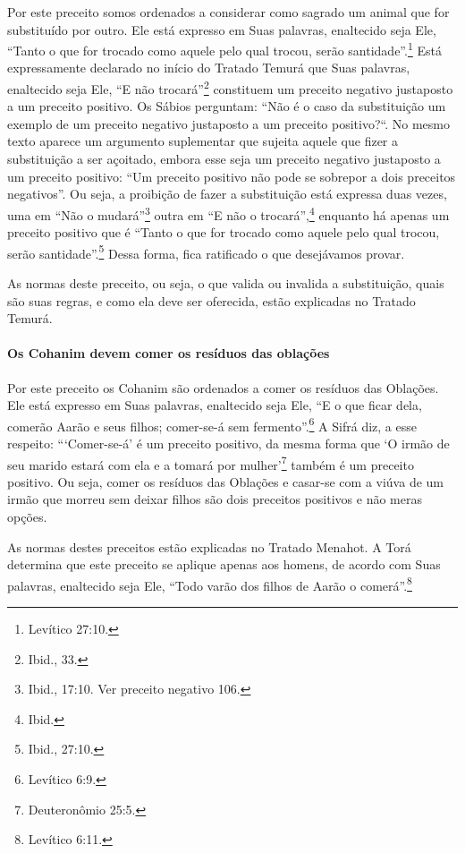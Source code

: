 Por este preceito somos ordenados a considerar como sagrado um animal
que for substituído por outro. Ele está expresso em Suas palavras,
enaltecido seja Ele, ``Tanto o que for trocado como aquele pelo qual
trocou, serão santidade''.\footnote{Levítico 27:10.} Está expressamente
declarado no início do Tratado Temurá que Suas palavras, enaltecido
seja Ele, ``E não trocará''\footnote{Ibid., 33.} constituem um preceito negativo
justaposto a um preceito positivo. Os Sábios perguntam: ``Não é o caso
da substituição um exemplo de um preceito negativo justaposto a um
preceito positivo?``. No mesmo texto aparece um argumento suplementar
que sujeita aquele que fizer a substituição a ser açoitado, embora esse
seja um preceito negativo justaposto a um preceito positivo: ``Um
preceito positivo não pode se sobrepor a dois preceitos negativos''. Ou
seja, a proibição de fazer a substituição está expressa duas vezes, uma
em ``Não o mudará''\footnote{Ibid., 17:10. Ver preceito negativo 106.} outra em ``E
não o trocará'',\footnote{Ibid.} enquanto há apenas um preceito positivo que é
``Tanto o que for trocado como aquele pelo qual trocou, serão
santidade''.\footnote{Ibid., 27:10.} Dessa forma, fica ratificado o que
desejávamos provar.

As normas deste preceito, ou seja, o que valida ou invalida a
substituição, quais são suas regras, e como ela deve ser oferecida,
estão explicadas no Tratado Temurá.

\paragraph{Os Cohanim devem comer os resíduos das oblações}

Por este preceito os Cohanim são ordenados a comer os resíduos das
Oblações. Ele está expresso em Suas palavras, enaltecido seja Ele, ``E o
que ficar dela, comerão Aarão e seus filhos; comer-se-á sem fermento''.\footnote{Levítico 6:9.} A Sifrá diz, a esse respeito: ```Comer-se-á' é um
preceito positivo, da mesma forma que `O irmão de seu marido estará com
ela e a tomará por mulher'\footnote{Deuteronômio 25:5.} também é um preceito
positivo. Ou seja, comer os resíduos das Oblações e casar-se com a viúva
de um irmão que morreu sem deixar filhos são dois preceitos positivos e
não meras opções.

As normas destes preceitos estão explicadas no Tratado Menahot. A Torá
determina que este preceito se aplique apenas aos homens, de acordo com
Suas palavras, enaltecido seja Ele, ``Todo varão dos filhos de Aarão o
comerá''.\footnote{Levítico 6:11.}

